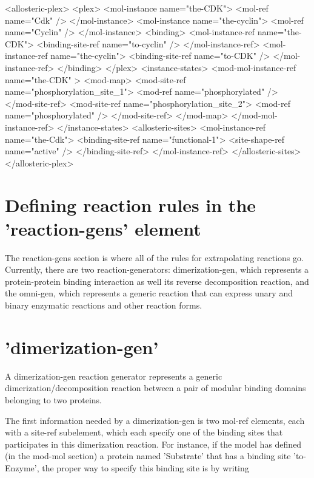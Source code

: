 \begin{ExampleXML}[caption=The full allosteric-omni specification for the Cyclin/Cdk system,label=fullAllostericOmniExample]
<allosteric-plex>
  <plex>
    <mol-instance name="the-CDK">
      <mol-ref name="Cdk" />
    </mol-instance>
    <mol-instance name="the-cyclin">
      <mol-ref name="Cyclin" />
    </mol-instance>
    <binding>
      <mol-instance-ref name="the-CDK">
	<binding-site-ref name="to-cyclin" />
      </mol-instance-ref>
      <mol-instance-ref name="the-cyclin">
	<binding-site-ref name="to-CDK" />
      </mol-instance-ref>
    </binding>
  </plex>
  <instance-states>
    <mod-mol-instance-ref name="the-CDK" >
      <mod-map>
	<mod-site-ref name="phosphorylation_site_1">
	  <mod-ref name="phosphorylated" />
	</mod-site-ref>
	<mod-site-ref name="phosphorylation_site_2">
	  <mod-ref name="phosphorylated" />
	</mod-site-ref>
      </mod-map>
    </mod-mol-instance-ref>
  </instance-states>
  <allosteric-sites>
    <mol-instance-ref name="the-Cdk">
      <binding-site-ref name="functional-1">
	<site-shape-ref name="active" />
      </binding-site-ref>
    </mol-instance-ref>
  </allosteric-sites>
</allosteric-plex>
\end{ExampleXML}
 
\section{Defining reaction rules in the 'reaction-gens' element}

The reaction-gens section is where all of the rules for extrapolating
reactions go.  Currently, there are two
reaction-generators: dimerization-gen, which represents a
protein-protein binding interaction as well its reverse decomposition
reaction, and the omni-gen, which represents a generic reaction that
can express unary and binary enzymatic reactions and other reaction
forms.  

\section{'dimerization-gen'}
A dimerization-gen reaction generator represents a generic
dimerization/decomposition reaction between a pair of modular binding
domains belonging to two proteins.  

The first information needed by a dimerization-gen is two mol-ref
elements, each with a site-ref subelement, which each specify one of
the binding sites that participates in this dimerization reaction.
For instance, if the model has defined (in the mod-mol section) a
protein named 'Substrate' that has a binding site 'to-Enzyme', the
proper way to specify this binding site is by writing 

